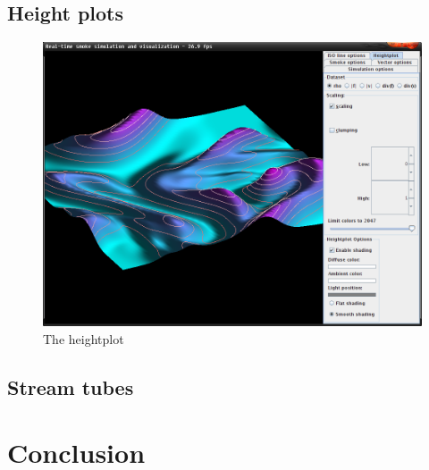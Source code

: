 \documentclass[a4paper,11pt,twoside]{report}
\begin{document}
	\section{Height plots}
		\begin{figure}[h]
		\centering
		\includegraphics[scale=\imagescalefactor]{images/step6.png}
		\caption{The heightplot}\label{fig:step1}
		\end{figure}
		\newpage
	\section{Stream tubes}
\chapter{Conclusion}
\end{document}
